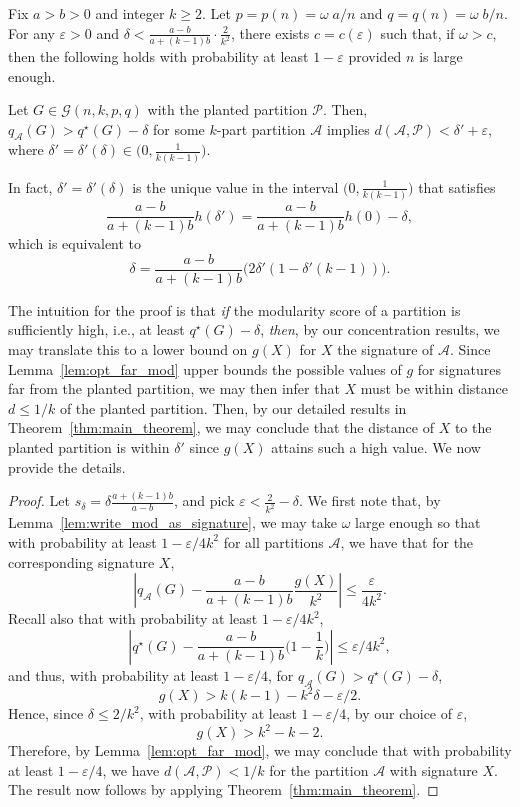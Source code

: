 \documentclass[a4paper,UKenglish,cleveref, autoref, thm-restate,numberwithinsect]{lipics-v2021}
\newcommand{\cA}{\mathcal{A}}
\newcommand{\cP}{\mathcal{P}}
\newcommand{\q}{q^{\star}}
\newcommand{\eps}{\varepsilon}
\begin{document}
\begin{proposition}    
\label{prop.detailed_close_is_close} 

Fix $a>b>0$ and integer $k\ge 2$. Let $p=p(n)=\omega\; a / n$ and $q=q(n)=\omega \; b/n$. For any $\eps>0$ and $\delta<\frac{a-b}{a+(k-1)b} \cdot \frac{2}{k^2}$, there exists $c=c(\eps)$ such that, if $\omega>c$, then the following holds with probability at least $1-\eps$ provided $n$ is large enough.


Let $G \in \mathcal{G}(n,k,p,q)$ with the planted partition $\cP$. 
%
Then, $q_\cA(G)>\q(G) - \delta $ for some $k$-part partition $\cA$ implies $d(\cA, \cP) < \delta' + \varepsilon$,
where $\delta' =\delta'(\delta) \in \big(0,\frac{1}{k(k-1)}\big)$.



In fact, $\delta'=\delta'(\delta)$ is the unique value in the interval $\big(0,\frac{1}{k(k-1)}\big)$ that satisfies 
$$
\frac {a-b}{a+(k-1)b} h(\delta') =  \frac {a-b}{a+(k-1)b} h(0)-\delta,
$$
which is equivalent to 
$$
\delta = \frac {a-b}{a+(k-1)b} \Big( 2 \delta' ( 1 - \delta'(k-1)) \Big).
$$
\end{proposition}

The intuition for the proof is that {\em if} the modularity score of a partition is sufficiently high, i.e., at least $\q(G)-\delta$, {\em then}, by our concentration results, we may translate this to a lower bound on $g(X)$ for $X$ the signature of $\cA$. Since Lemma~\ref{lem:opt_far_mod} upper bounds the possible values of $g$ for signatures far from the planted partition, we may then infer that $X$ must be within distance $d\leq 1/k$ of the planted partition. Then, by our detailed results in Theorem~\ref{thm:main_theorem}, we may conclude that the distance of $X$ to the planted partition is within $\delta'$ since $g(X)$ attains such a high value.
We now provide the details.

\begin{proof} Let $s_\delta=\delta \frac{a+(k-1)b}{a-b}$, and pick $\eps < \frac{2}{k^2}-\delta$.
We first note that, by Lemma~\ref{lem:write_mod_as_signature}, we may take $\omega$ large enough so that with probability at least $1-\eps/4k^2$ for all  partitions $\cA$, we have that for the corresponding signature $X$,
\[ |q_\cA(G) - \frac{a-b}{a+(k-1)b}\frac{g(X)}{k^2} |\leq \frac{\eps}{4k^2}.\]
%
Recall also that with probability at least $1-\eps/4k^2$, \[ |\q(G) - \frac{a-b}{a+(k-1)b}\big(1-\frac{1}{k}\big)| \leq \eps /4k^2, \]
and thus, with probability at least $1-\eps/4$, for $q_\cA(G)>\q(G)-\delta$,
\[ g(X)> k(k-1) -k^2\delta -  \eps/2.\]
%
Hence, since $\delta \leq 2/k^2$, with probability at least $1-\eps/4$, by our choice of $\eps$,
\[ g(X)> k^2 - k -2.\]
Therefore, by Lemma~\ref{lem:opt_far_mod}, 
we may conclude that with probability at least $1-\eps/4$, we have $d(\cA, \cP)<1/k$ for the partition $\cA$ with signature $X$. The result now follows by applying Theorem~\ref{thm:main_theorem}. 
%
%
\end{proof}
\end{document}
